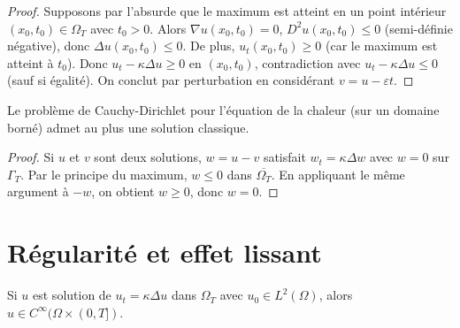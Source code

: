 \begin{proof}
Supposons par l'absurde que le maximum est atteint en un point int\'erieur
$(x_0, t_0) \in \Omega_T$ avec $t_0 > 0$. Alors $\nabla u(x_0, t_0) = 0$,
$D^2 u(x_0, t_0) \leq 0$ (semi-d\'efinie n\'egative), donc
$\Delta u(x_0, t_0) \leq 0$. De plus, $u_t(x_0, t_0) \geq 0$ (car le
maximum est atteint \`a $t_0$). Donc
$u_t - \kappa\Delta u \geq 0$ en $(x_0, t_0)$, contradiction avec
$u_t - \kappa\Delta u \leq 0$ (sauf si \'egalit\'e). On conclut par
perturbation en consid\'erant $v = u - \varepsilon t$.
\end{proof}

\begin{center}
\end{center}

\begin{corollaire}[Unicit\'e]
Le probl\`eme de Cauchy-Dirichlet pour l'\'equation de la chaleur
(sur un domaine born\'e) admet au plus une solution classique.
\end{corollaire}

\begin{proof}
Si $u$ et $v$ sont deux solutions, $w = u - v$ satisfait $w_t = \kappa\Delta w$
avec $w = 0$ sur $\Gamma_T$. Par le principe du maximum, $w \leq 0$ dans
$\overline{\Omega_T}$. En appliquant le m\^eme argument \`a $-w$, on obtient
$w \geq 0$, donc $w = 0$.
\end{proof}

\section{R\'egularit\'e et effet lissant}

\begin{theoreme}
Si $u$ est solution de $u_t = \kappa\Delta u$ dans $\Omega_T$ avec
$u_0 \in L^2(\Omega)$, alors $u \in C^\infty(\Omega \times (0,T])$.
\end{theoreme}

